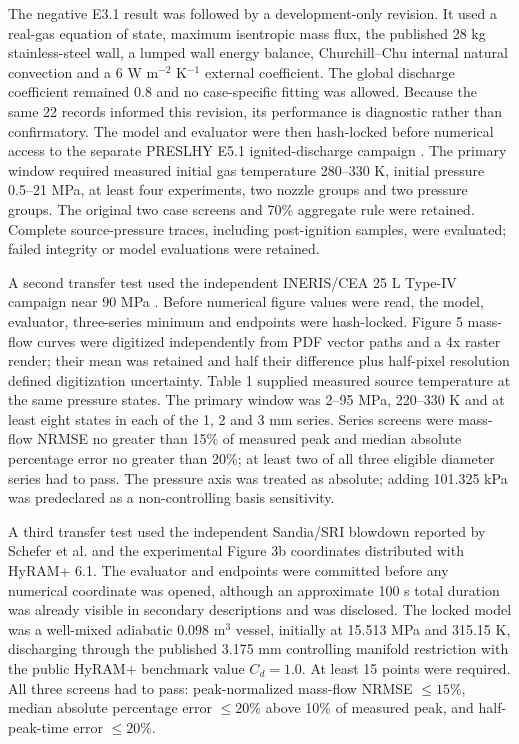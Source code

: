\documentclass[12pt,a4paper]{article}
\begin{document}
The negative E3.1 result was followed by a development-only revision. It used a
real-gas equation of state, maximum isentropic mass flux, the published 28 kg
stainless-steel wall, a lumped wall energy balance, Churchill--Chu internal
natural convection and a 6 W m$^{-2}$ K$^{-1}$ external coefficient. The global
discharge coefficient remained 0.8 and no case-specific fitting was allowed.
Because the same 22 records informed this revision, its performance is diagnostic
rather than confirmatory. The model and evaluator were then hash-locked before
numerical access to the separate PRESLHY E5.1 ignited-discharge campaign
\cite{preslhye5}. The primary window required measured initial gas temperature
280--330 K, initial pressure 0.5--21 MPa, at least four experiments, two nozzle
groups and two pressure groups. The original two case screens and 70\% aggregate
rule were retained. Complete source-pressure traces, including post-ignition
samples, were evaluated; failed integrity or model evaluations were retained.

A second transfer test used the independent INERIS/CEA 25 L Type-IV campaign
near 90 MPa \cite{proust2011}. Before numerical figure values were read, the
model, evaluator, three-series minimum and endpoints were hash-locked. Figure 5
mass-flow curves were digitized independently from PDF vector paths and a 4x
raster render; their mean was retained and half their difference plus half-pixel
resolution defined digitization uncertainty. Table 1 supplied measured source
temperature at the same pressure states. The primary window was 2--95 MPa,
220--330 K and at least eight states in each of the 1, 2 and 3 mm series. Series
screens were mass-flow NRMSE no greater than 15\% of measured peak and median
absolute percentage error no greater than 20\%; at least two of all three
eligible diameter series had to pass. The pressure axis was treated as absolute;
adding 101.325 kPa was predeclared as a non-controlling basis sensitivity.

A third transfer test used the independent Sandia/SRI blowdown reported by
Schefer et al. \cite{schefer2006} and the experimental Figure 3b coordinates
distributed with HyRAM+ 6.1. The evaluator and endpoints were committed before
any numerical coordinate was opened, although an approximate 100 s total
duration was already visible in secondary descriptions and was disclosed. The
locked model was a well-mixed adiabatic 0.098 m$^3$ vessel, initially at
15.513 MPa and 315.15 K, discharging through the published 3.175 mm controlling
manifold restriction with the public HyRAM+ benchmark value $C_d=1.0$. At least
15 points were required. All three screens had to pass: peak-normalized mass-flow
NRMSE $\leq15\%$, median absolute percentage error $\leq20\%$ above 10\% of
measured peak, and half-peak-time error $\leq20\%$.
\end{document}
